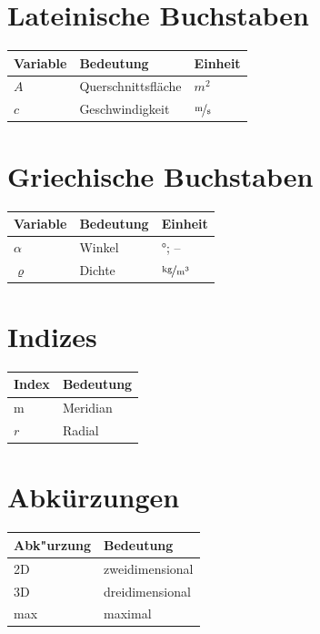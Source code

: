 \documentclass[bachelor,       %
               twoside,        %
               BCOR10mm,       %
               ngerman,english  %
               ]{GAUBM}
\newcommand{\tabheadfont}[1]{\textbf{#1}} %
\begin{document}
\begin{nomenclature}
\section*{Lateinische Buchstaben}
\noindent
\begin{longtable}[l]{p{}p{}p{}}
  \tabheadfont{Variable}&\tabheadfont{Bedeutung}&\tabheadfont{Einheit}\\\midrule\endhead
  $A$ & Querschnittsfl{\"a}che & $\unit{m^2}$\\
  $c$ & Geschwindigkeit & $\unitfrac{m}{s}$
\end{longtable}
\section*{Griechische Buchstaben}
\begin{longtable}[l]{p{}p{}p{}}
  \tabheadfont{Variable}&\tabheadfont{Bedeutung}&\tabheadfont{Einheit}\\\midrule\endhead
  $\alpha$  & Winkel & $\unit{\degree}$; --\\
  $\varrho$ & Dichte & $\unitfrac{kg}{m^3}$
\end{longtable}
\section*{Indizes}
\begin{longtable}[l]{p{}p{}}
  \tabheadfont{Index}&\tabheadfont{Bedeutung}\\\midrule\endhead
  m & Meridian\\
  $r$ & Radial
\end{longtable}
\section*{Abk{\"u}rzungen}
\begin{longtable}[l]{p{}p{}}
  \tabheadfont{Abk"urzung}&\tabheadfont{Bedeutung}\\\midrule\endhead
  2D & zweidimensional\\
  3D & dreidimensional\\
  max & maximal
\end{longtable}
\end{nomenclature}
\end{document}

